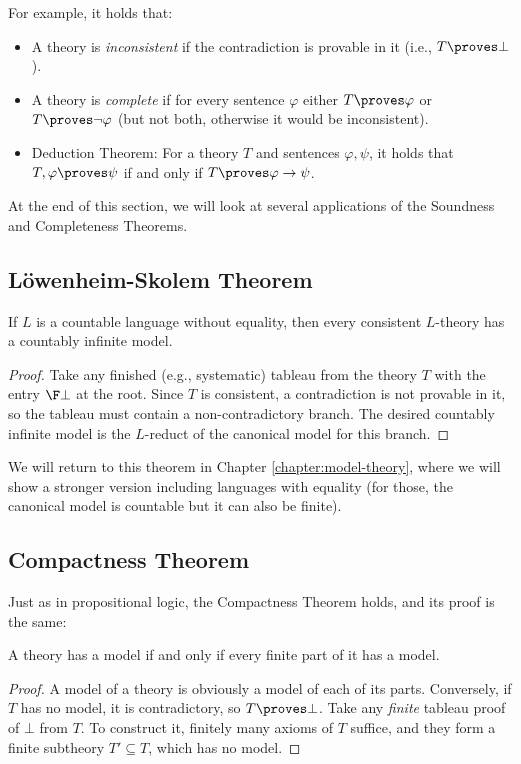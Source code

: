 For example, it holds that:
\begin{itemize}
    \item A theory is \emph{inconsistent} if the contradiction is provable in it (i.e., $T\proves\bot$).
    \item A theory is \emph{complete} if for every sentence $\varphi$ either $T\proves\varphi$ or $T\proves\neg\varphi$ (but not both, otherwise it would be inconsistent).
    \item Deduction Theorem: For a theory $T$ and sentences $\varphi,\psi$, it holds that $T,\varphi\proves\psi$ if and only if $T\proves\varphi\to\psi$.
\end{itemize}

At the end of this section, we will look at several applications of the Soundness and Completeness Theorems.

\subsection{Löwenheim-Skolem Theorem}\label{subsection:loewenheim-skolem-theorem}

\begin{theorem}
    If $L$ is a countable language without equality, then every consistent $L$-theory has a countably infinite model.
\end{theorem}

\begin{proof}
Take any finished (e.g., systematic) tableau from the theory $T$ with the entry $\F\bot$ at the root. Since $T$ is consistent, a contradiction is not provable in it, so the tableau must contain a non-contradictory branch. The desired countably infinite model is the $L$-reduct of the canonical model for this branch.
\end{proof}

We will return to this theorem in Chapter \ref{chapter:model-theory}, where we will show a stronger version including languages with equality (for those, the canonical model is countable but it can also be finite).

\subsection{Compactness Theorem}

Just as in propositional logic, the Compactness Theorem holds, and its proof is the same:

\begin{theorem}[On Compactness]\label{theorem:compactness-theorem-predicate}
    A theory has a model if and only if every finite part of it has a model.    
\end{theorem}
\begin{proof}
A model of a theory is obviously a model of each of its parts. Conversely, if $T$ has no model, it is contradictory, so $T\proves\bot$. Take any \emph{finite} tableau proof of $\bot$ from $T$. To construct it, finitely many axioms of $T$ suffice, and they form a finite subtheory $T'\subseteq T$, which has no model.
\end{proof}


